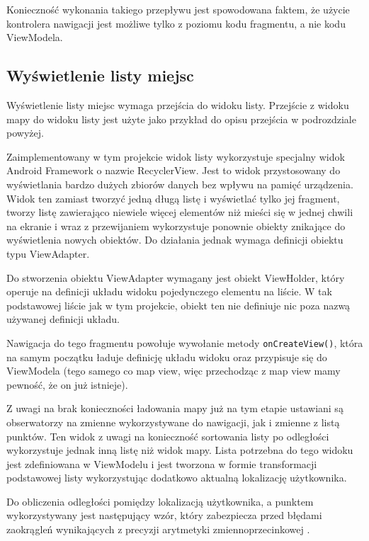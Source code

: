 \documentclass[polish,polish,a4paper,12pt]{article}
\begin{document}
	Konieczność wykonania takiego przepływu jest spowodowana faktem, że użycie kontrolera nawigacji jest możliwe tylko z poziomu kodu fragmentu, a nie kodu ViewModela.

	\subsection{Wyświetlenie listy miejsc}

	Wyświetlenie listy miejsc wymaga przejścia do widoku listy. Przejście z widoku mapy do widoku listy jest użyte jako przykład do opisu przejścia w podrozdziale powyżej.

	Zaimplementowany w tym projekcie widok listy wykorzystuje specjalny widok Android Framework o nazwie RecyclerView. Jest to widok przystosowany do wyświetlania bardzo dużych zbiorów danych bez wpływu na pamięć urządzenia. Widok ten zamiast tworzyć jedną długą listę i wyświetlać tylko jej fragment, tworzy listę zawierająco niewiele więcej elementów niż mieści się w jednej chwili na ekranie i wraz z przewijaniem wykorzystuje ponownie obiekty znikające do wyświetlenia nowych obiektów. Do działania jednak wymaga definicji obiektu typu ViewAdapter.

	Do stworzenia obiektu ViewAdapter wymagany jest obiekt ViewHolder, który operuje na definicji układu widoku pojedynczego elementu na liście. W tak podstawowej liście jak w tym projekcie, obiekt ten nie definiuje nic poza nazwą używanej definicji układu.

	Nawigacja do tego fragmentu powołuje wywołanie metody \texttt{onCreateView()}, która na samym początku ładuje definicję układu widoku oraz przypisuje się do ViewModela (tego samego co map view, więc przechodząc z map view mamy pewność, że on już istnieje).

	Z uwagi na brak konieczności ładowania mapy już na tym etapie ustawiani są obserwatorzy na zmienne wykorzystywane do nawigacji, jak i zmienne z listą punktów. Ten widok z uwagi na konieczność sortowania listy po odległości wykorzystuje jednak inną listę niż widok mapy. Lista potrzebna do tego widoku jest zdefiniowana w ViewModelu i jest tworzona w formie transformacji podstawowej listy wykorzystując dodatkowo aktualną lokalizację użytkownika.

	Do obliczenia odległości pomiędzy lokalizacją użytkownika, a punktem wykorzystywany jest następujący wzór, który zabezpiecza przed błędami zaokrągleń wynikających z precyzji arytmetyki zmiennoprzecinkowej \cite{haversineformulawiki}.
\end{document}
